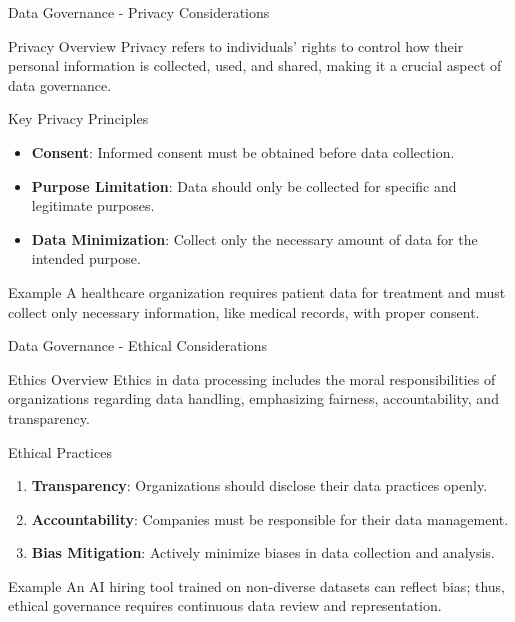 \documentclass[aspectratio=169]{beamer}
\begin{document}
\begin{frame}[fragile]{Data Governance - Privacy Considerations}
    \begin{block}{Privacy Overview}
        Privacy refers to individuals' rights to control how their personal information is collected, used, and shared, making it a crucial aspect of data governance.
    \end{block}

    \begin{block}{Key Privacy Principles}
        \begin{itemize}
            \item \textbf{Consent}: Informed consent must be obtained before data collection.
            \item \textbf{Purpose Limitation}: Data should only be collected for specific and legitimate purposes.
            \item \textbf{Data Minimization}: Collect only the necessary amount of data for the intended purpose.
        \end{itemize}
    \end{block}

    \begin{block}{Example}
        A healthcare organization requires patient data for treatment and must collect only necessary information, like medical records, with proper consent.
    \end{block}
\end{frame}

\begin{frame}[fragile]{Data Governance - Ethical Considerations}
    \begin{block}{Ethics Overview}
        Ethics in data processing includes the moral responsibilities of organizations regarding data handling, emphasizing fairness, accountability, and transparency.
    \end{block}

    \begin{block}{Ethical Practices}
        \begin{enumerate}
            \item \textbf{Transparency}: Organizations should disclose their data practices openly.
            \item \textbf{Accountability}: Companies must be responsible for their data management.
            \item \textbf{Bias Mitigation}: Actively minimize biases in data collection and analysis.
        \end{enumerate}
    \end{block}

    \begin{block}{Example}
        An AI hiring tool trained on non-diverse datasets can reflect bias; thus, ethical governance requires continuous data review and representation.
    \end{block}
\end{frame}
\end{document}
